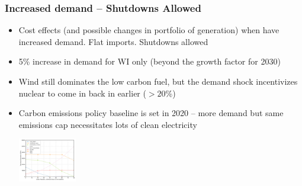 \documentclass[xcolor=dvipsnames]{beamer}
\begin{document}
\begin{frame}
  \frametitle{Increased demand -- Shutdowns Allowed}

\begin{itemize}
  \item Cost effects (and possible changes in portfolio of generation) when
have increased demand.  Flat imports. Shutdowns allowed
  \item 5\% increase in demand for WI only (beyond the growth factor for 2030)
  \item Wind still dominates the low carbon fuel, but the demand shock incentivizes nuclear to come in back in earlier ($>20$\%)
  \item Carbon emissions policy baseline is set in 2020 -- more demand but same emissions cap necessitates lots of clean electricity

  \includegraphics[width=0.20\textwidth]{includes/no_leakage_demand_shock_agg_generation_cntlreg.png}

%
%

\end{itemize}

\end{frame}


%
%
%
\end{document}
